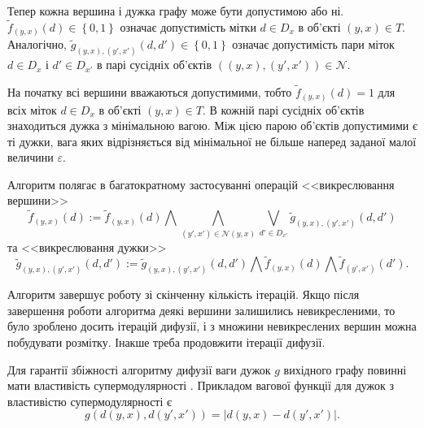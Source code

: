 
Тепер кожна вершина і дужка графу може бути допустимою або ні.
$\tilde{f}_{\left(y, x \right)} \left(d \right) \in \left\{ 0, 1 \right\}$
означає допустимість мітки
$d \in D_x$ в об'єкті $\left(y,x \right) \in T$.
Аналогічно,
$\tilde{g}_{\left(y,x \right), \left(y', x' \right)} \left(d, d' \right)
    \in \left\{ 0, 1 \right\}$
означає допустимість пари міток $d \in D_x$ і $d' \in D_{x'}$
в парі сусідніх об'єктів
$\left( \left(y,x \right), \left(y', x' \right) \right) \in \mathcal{N}$.

На початку всі вершини вважаються допустимими, тобто
$\tilde{f}_{\left(y, x \right)} \left(d \right) = 1$ для всіх
міток $d \in D_x$ в об'єкті $\left(y,x \right) \in T$.
В кожній парі сусідніх об'єктів знаходиться дужка з мінімальною вагою.
Між цією парою об'єктів допустимими є ті дужки,
вага яких відрізняється від мінімальної не більше
наперед заданої малої величини $\varepsilon$.

Алгоритм полягає в багатократному застосуванні операцій
<<викреслювання вершини>>
\begin{equation*}
    \tilde{f}_{\left(y, x \right)} \left(d \right)
    := \tilde{f}_{\left(y, x \right)} \left(d \right)
    \bigwedge \bigwedge \limits_{\left(y', x' \right)\in \mathcal{N}\left(y,x \right)}
        \bigvee \limits_{d' \in D_{x'}}
            \tilde{g}_{\left(y,x \right), \left(y', x' \right)}
                \left(d, d' \right)
\end{equation*}
та <<викреслювання дужки>>
\begin{equation*}
    \tilde{g}_{\left(y,x \right), \left(y', x' \right)} \left(d, d' \right)
    := \tilde{g}_{\left(y,x \right), \left(y', x' \right)} \left(d, d' \right)
    \bigwedge \tilde{f}_{\left(y, x \right)} \left(d \right)
    \bigwedge \tilde{f}_{\left(y', x' \right)} \left(d' \right).
\end{equation*}


Алгоритм завершує роботу зі скінченну кількість ітерацій.
Якщо після завершення роботи алгоритма деякі вершини залишились невикресленими,
то було зроблено досить ітерацій дифузії,
і з множини невикреслених вершин можна побудувати розмітку.
Інакше треба продовжити ітерації дифузії.


Для гарантії збіжності алгоритму дифузії ваги дужок $g$
вихідного графу повинні мати властивість супермодулярності
\cite{diffusion:shlezinger:supermodularity}.
Прикладом вагової функції для дужок з властивістю супермодулярності є
\begin{equation*}
    g \left( d \left( y, x \right), d \left( y', x' \right) \right)
    = \left| d \left( y, x \right) - d \left( y', x' \right) \right|.
\end{equation*}

